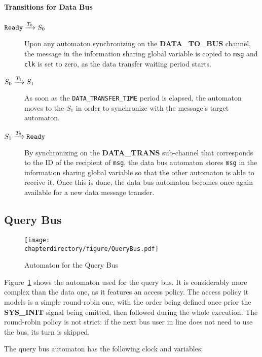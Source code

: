 \paragraph{Transitions for Data Bus}
\begin{description}
\item[$\texttt{Ready} \xrightarrow[]{T_{0}} S_0$]
   Upon any automaton synchronizing on the \textbf{DATA\_TO\_BUS} channel,
   the message in the information sharing global variable is copied to
   \lstinline!msg! and \lstinline!clk! is set to zero, as the data transfer
   waiting period starts.

\item[$S_0 \xrightarrow[]{T_{1}} S_1$]
   As soon as the \lstinline!DATA_TRANSFER_TIME! period is elapsed, the
   automaton moves to the $S_1$ in order to synchronize with the message's
   target automaton.

\item[$S_1 \xrightarrow[]{T_{2}} \texttt{Ready}$]
   By synchronizing on the \textbf{DATA\_TRANS} sub-channel that corresponds to
   the ID of the recipient of \lstinline!msg!, the data bus automaton stores
   \lstinline!msg! in the information sharing global variable so that the other
   automaton is able to receive it. Once this is done, the data bus automaton
   becomes once again available for a new data message transfer.
\end{description}

\subsection{Query Bus}
\begin{figure}[hbt!]
\begin{center}
\texttt{[image: \\chapterdirectory/figure/QueryBus.pdf]}
\end{center}
\caption{Automaton for the Query Bus}
\label{fig:UPPAAL:QueryBus}
\end{figure}
Figure~\ref{fig:UPPAAL:QueryBus} shows the automaton used for the query bus. It
is considerably more complex than the data one, as it features an access
policy. The access policy it models is a simple round-robin one, with the
order being defined once prior the \textbf{SYS\_INIT} signal being emitted,
then followed during the whole execution. The round-robin policy is not strict:
if the next bus user in line does not need to use the bus, its turn is skipped.

The query bus automaton has the following clock and variables:
